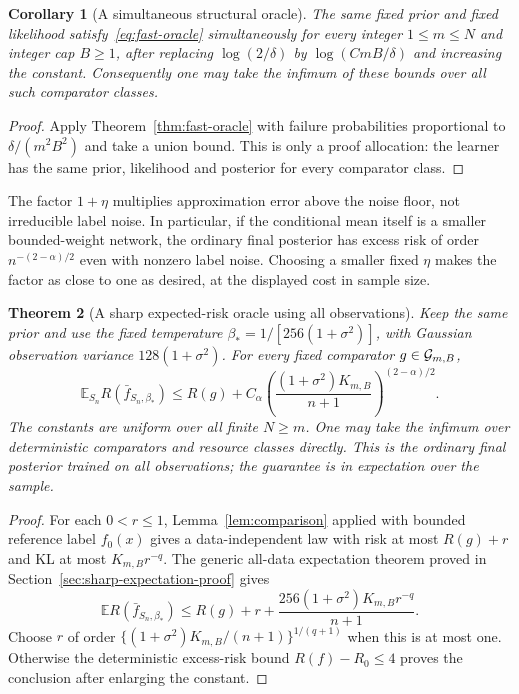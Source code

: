 \documentclass[11pt]{article}
\newtheorem{theorem}{Theorem}[section]\newtheorem{lemma}[theorem]{Lemma}
\newtheorem{corollary}[theorem]{Corollary}\newtheorem{proposition}[theorem]{Proposition}
\theoremstyle{remark}\newtheorem{remark}[theorem]{Remark}
\newcommand{\E}{\mathbb E}\newcommand{\R}{\mathbb R}\newcommand{\Pp}{\mathbb P}
\begin{document}
\begin{corollary}[A simultaneous structural oracle]\label{cor:structural-oracle}
The same fixed prior and fixed likelihood satisfy~\eqref{eq:fast-oracle} simultaneously for every integer $1\le m\le N$ and integer cap $B\ge1$, after replacing $\log(2/\delta)$ by $\log(CmB/\delta)$ and increasing the constant. Consequently one may take the infimum of these bounds over all such comparator classes.
\end{corollary}
\begin{proof}
Apply Theorem~\ref{thm:fast-oracle} with failure probabilities proportional to $\delta/(m^2B^2)$ and take a union bound. This is only a proof allocation: the learner has the same prior, likelihood and posterior for every comparator class.
\end{proof}

The factor $1+\eta$ multiplies approximation error above the noise floor, not irreducible label noise. In particular, if the conditional mean itself is a smaller bounded-weight network, the ordinary final posterior has excess risk of order $n^{-(2-\alpha)/2}$ even with nonzero label noise. Choosing a smaller fixed $\eta$ makes the factor as close to one as desired, at the displayed cost in sample size.

\begin{theorem}[A sharp expected-risk oracle using all observations]
\label{thm:expected-oracle}
Keep the same prior and use the fixed temperature
$\beta_*=1/[256(1+\sigma^2)]$, with Gaussian observation variance
$128(1+\sigma^2)$. For every fixed comparator $g\in\mathcal G_{m,B}$,
\[
 \E_{S_n}R(\bar f_{S_n,\beta_*})
 \le R(g)+C_\alpha
 \left(\frac{(1+\sigma^2)K_{m,B}}{n+1}\right)^{(2-\alpha)/2}.
\]
The constants are uniform over all finite $N\ge m$. One may take the infimum over deterministic comparators and resource classes directly. This is the ordinary final posterior trained on all observations; the guarantee is in expectation over the sample.
\end{theorem}
\begin{proof}
For each $0<r\le1$, Lemma~\ref{lem:comparison} applied with bounded reference label $f_0(x)$ gives a data-independent law with risk at most $R(g)+r$ and KL at most $K_{m,B}r^{-q}$. The generic all-data expectation theorem proved in Section~\ref{sec:sharp-expectation-proof} gives
\[
 \E R(\bar f_{S_n,\beta_*})
 \le R(g)+r+\frac{256(1+\sigma^2)K_{m,B}r^{-q}}{n+1}.
\]
Choose $r$ of order $\{(1+\sigma^2)K_{m,B}/(n+1)\}^{1/(q+1)}$ when this is at most one. Otherwise the deterministic excess-risk bound $R(f)-R_0\le4$ proves the conclusion after enlarging the constant.
\end{proof}
\end{document}

